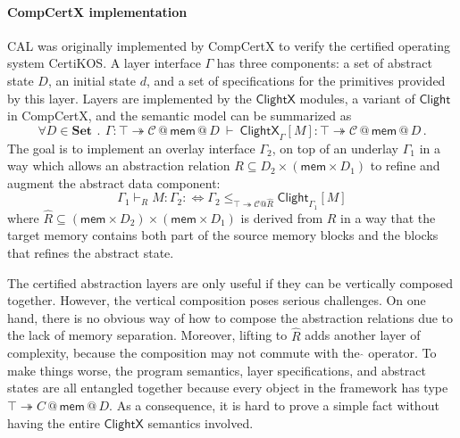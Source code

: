 \documentclass[acmsmall,screen,review,anonymous]{acmart}
\newcommand{\kw}[1]{\ensuremath{ \mathsf{#1} }}
\begin{document}
\paragraph{CompCertX implementation}
CAL was originally implemented by CompCertX \cite{popl15}
to verify the certified operating system CertiKOS.
A layer interface $\Gamma$ has three components:
a set of abstract state $D$,
an initial state $d$,
and a set of specifications
for the primitives provided by this layer.
Layers are implemented by the $\kw{ClightX}$ modules,
a variant of $\kw{Clight}$ in CompCertX,
and the semantic model can be summarized as
\[
  \forall D \in \mathbf{Set}
  \: \mathbin. \:
  \Gamma :
    \top \twoheadrightarrow
    \mathcal{C} \mathbin@ \kw{mem} \mathbin@ D
  \: \vdash \:
  \kw{ClightX}_{\Gamma}[M] :
    \top \twoheadrightarrow
    \mathcal{C} \mathbin@ \kw{mem} \mathbin@ D
  \,.
\]
The goal is to implement an overlay interface $\Gamma_2$,
on top of an underlay $\Gamma_1$
in a way which allows an abstraction relation
$R \subseteq D_2 \times (\kw{mem} \times D_1)$
to refine and augment the abstract data component:
\[
  \Gamma_1 \vdash_R M : \Gamma_2 :\Leftrightarrow
  \Gamma_2 \le_{\top \twoheadrightarrow \mathcal{C}@\hat{R}}
    \kw{Clight}_{\Gamma_1}[M]
\]
where $\hat{R} \subseteq (\kw{mem} \times D_2) \times (\kw{mem} \times D_1)$
is derived from $R$ in a way that
the target memory contains both
part of the source memory blocks and
the blocks that refines the abstract state.

The certified abstraction layers are only
useful if they can be vertically composed together.
However,
the vertical composition poses serious challenges.
On one hand,
there is no obvious way of
how to compose the abstraction relations
due to the lack of memory separation.
Moreover,
lifting to $\hat{R}$ adds another layer of complexity,
because the composition may not commute with the $\hat{}$ operator.
To make things worse,
the program semantics, layer specifications,
and abstract states are all entangled together
because every object in the framework
has type $\top \twoheadrightarrow C\mathbin@ \kw{mem} \mathbin@ D$.
As a consequence,
it is hard to prove a simple fact without having
the entire $\kw{ClightX}$ semantics involved.

\end{document}
